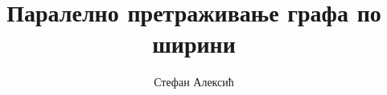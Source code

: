 \documentclass[12pt]{report}
\title{Паралелно претраживање графа по ширини}
\author{Стефан Алексић}
\begin{document}
\begin{sloppypar}


             









\typeout{}


\appendix
%

\end{sloppypar}
\end{document}
